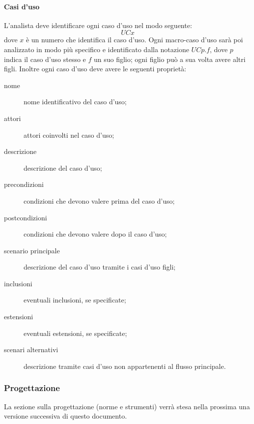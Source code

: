 		\paragraph{Casi d'uso}
		L'analista deve identificare ogni caso d'uso nel modo seguente:
			\[UCx\]
		dove $x$ è un numero che identifica il caso d'uso. Ogni macro-caso d'uso sarà poi analizzato in modo più specifico e identificato dalla notazione $UCp.f$, dove $p$ indica il caso d'uso stesso e $f$ un suo figlio; ogni figlio può a sua volta avere altri figli. Inoltre ogni caso d'uso deve avere le seguenti proprietà:
		\begin{description}
			\item[nome] nome identificativo del caso d'uso;
			\item[attori] attori coinvolti nel caso d'uso;
			\item[descrizione] descrizione del caso d'uso;
			\item[precondizioni] condizioni che devono valere prima del caso d'uso;%
			\item[postcondizioni] condizioni che devono valere dopo il caso d'uso;%
			\item[scenario principale] descrizione del caso d'uso tramite i casi d'uso figli;
			\item[inclusioni] eventuali inclusioni, se specificate;
			\item[estensioni] eventuali estensioni, se specificate;
			\item[scenari alternativi] descrizione tramite casi d'uso non appartenenti al flusso principale.
		\end{description}
	\subsubsection{Progettazione}
	La sezione sulla progettazione (norme e strumenti) verrà stesa nella prossima una versione successiva di questo documento.
